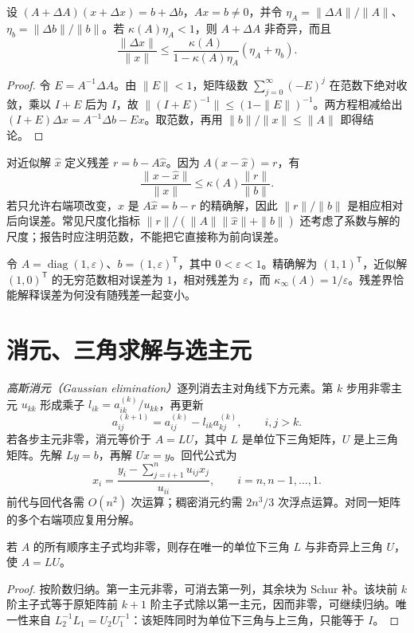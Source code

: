 \documentclass[UTF8,12pt,a4paper,fontset=fandol]{ctexbook}
\begin{document}
\begin{theorem}[系数与右端项同时扰动]
\label{thm:na-linear-perturbation}
设 $(A+\Delta A)(x+\Delta x)=b+\Delta b$，$Ax=b\ne0$，并令 $\eta_A=\|\Delta A\|/\|A\|$、$\eta_b=\|\Delta b\|/\|b\|$。若 $\kappa(A)\eta_A<1$，则 $A+\Delta A$ 非奇异，而且
\[
 \frac{\|\Delta x\|}{\|x\|}\le
 \frac{\kappa(A)}{1-\kappa(A)\eta_A}(\eta_A+\eta_b).
\]
\end{theorem}
\begin{proof}
令 $E=A^{-1}\Delta A$。由 $\|E\|<1$，矩阵级数 $\sum_{j=0}^{\infty}(-E)^j$ 在范数下绝对收敛，乘以 $I+E$ 后为 $I$，故 $\|(I+E)^{-1}\|\le(1-\|E\|)^{-1}$。两方程相减给出 $(I+E)\Delta x=A^{-1}\Delta b-Ex$。取范数，再用 $\|b\|/\|x\|\le\|A\|$ 即得结论。
\end{proof}

对近似解 $\widehat x$ 定义残差 $r=b-A\widehat x$。因为 $A(x-\widehat x)=r$，有
\[
 \frac{\|x-\widehat x\|}{\|x\|}\le\kappa(A)\frac{\|r\|}{\|b\|}.
\]
若只允许右端项改变，$\widehat x$ 是 $A\widehat x=b-r$ 的精确解，因此 $\|r\|/\|b\|$ 是相应相对后向误差。常见尺度化指标 $\|r\|/(\|A\|\|\widehat x\|+\|b\|)$ 还考虑了系数与解的尺度；报告时应注明范数，不能把它直接称为前向误差。

\begin{example}[病态系统中的小残差]
令 $A=\operatorname{diag}(1,\varepsilon)$、$b=(1,\varepsilon)^{\mathsf T}$，其中 $0<\varepsilon<1$。精确解为 $(1,1)^{\mathsf T}$，近似解 $(1,0)^{\mathsf T}$ 的无穷范数相对误差为 $1$，相对残差为 $\varepsilon$，而 $\kappa_\infty(A)=1/\varepsilon$。残差界恰能解释误差为何没有随残差一起变小。
\end{example}

\section{消元、三角求解与选主元}
\emph{高斯消元（Gaussian elimination）}逐列消去主对角线下方元素。第 $k$ 步用非零主元 $u_{kk}$ 形成乘子 $l_{ik}=a_{ik}^{(k)}/u_{kk}$，再更新
\[
 a_{ij}^{(k+1)}=a_{ij}^{(k)}-l_{ik}a_{kj}^{(k)},\qquad i,j>k.
\]
若各步主元非零，消元等价于 $A=LU$，其中 $L$ 是单位下三角矩阵，$U$ 是上三角矩阵。先解 $Ly=b$，再解 $Ux=y$。回代公式为
\[
 x_i=\frac{y_i-\sum_{j=i+1}^{n}u_{ij}x_j}{u_{ii}},\qquad i=n,n-1,\ldots,1.
\]
前代与回代各需 $O(n^2)$ 次运算；稠密消元约需 $2n^3/3$ 次浮点运算。对同一矩阵的多个右端项应复用分解。

\begin{proposition}
若 $A$ 的所有顺序主子式均非零，则存在唯一的单位下三角 $L$ 与非奇异上三角 $U$，使 $A=LU$。
\end{proposition}
\begin{proof}
按阶数归纳。第一主元非零，可消去第一列，其余块为 Schur 补。该块前 $k$ 阶主子式等于原矩阵前 $k+1$ 阶主子式除以第一主元，因而非零，可继续归纳。唯一性来自 $L_2^{-1}L_1=U_2U_1^{-1}$：该矩阵同时为单位下三角与上三角，只能等于 $I$。
\end{proof}
\end{document}
